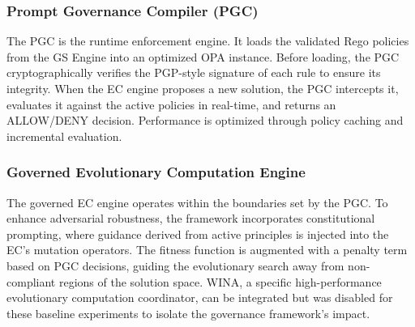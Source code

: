 \subsubsection{Prompt Governance Compiler (PGC)}
The PGC is the runtime enforcement engine. It loads the validated Rego policies from the GS Engine into an optimized OPA instance. Before loading, the PGC cryptographically verifies the PGP-style signature of each rule to ensure its integrity. When the EC engine proposes a new solution, the PGC intercepts it, evaluates it against the active policies in real-time, and returns an ALLOW/DENY decision. Performance is optimized through policy caching and incremental evaluation.

\subsubsection{Governed Evolutionary Computation Engine}
The governed EC engine operates within the boundaries set by the PGC\@. To enhance adversarial robustness, the framework incorporates constitutional prompting, where guidance derived from active principles is injected into the EC's mutation operators. The fitness function is augmented with a penalty term based on PGC decisions, guiding the evolutionary search away from non-compliant regions of the solution space. WINA, a specific high-performance evolutionary computation coordinator, can be integrated but was disabled for these baseline experiments to isolate the governance framework's impact.
